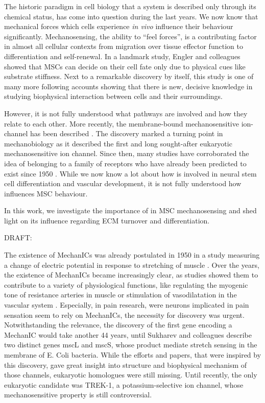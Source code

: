 The historic paradigm in cell biology that a system is described only through its chemical status, has come into question during the last years. We now know that mechanical forces which cells experience \textit{in vivo} influence their behaviour significantly\cite{Hao2015}. Mechanosensing, the ability to “feel forces”, is a contributing factor in almost all cellular contexts from migration over tissue effector function to differentiation and self-renewal. In a landmark study, Engler and colleagues\cite{Engler2006} showed that MSCs can decide on their cell fate only due to physical cues like substrate stiffness. Next to a remarkable discovery by itself, this study is one of many more following accounts showing that there is new, decisive knowledge in studying biophysical interaction between cells and their surroundings.\par

However, it is not fully understood what pathways are involved and how they relate to each other. More recently, the membrane-bound mechanosensitive ion-channel \Piezo{} has been described \cite{Coste2010}. The discovery marked a turning point in mechanobiology as it described the first and long sought-after eukaryotic mechanosensitive ion channel. \cite{Sharif-Naeini2015} Since then, many studies have corroborated the idea of \Piezo{} belonging to a family of receptors who have already been predicted to exist since 1950 \cite{Katz1949}. While we now know a lot about how \Piezo{} is involved in neural stem cell differentiation and vascular development, it is not fully understood how \Piezo{} influences MSC behaviour. \par
In this work, we investigate the importance of \Piezo{} in MSC mechanosensing and shed light on its influence regarding ECM turnover and differentiation.


DRAFT: 


The existence of MechanICs was already postulated in 1950 in a study measuring a change of electric potential in response to stretching of muscle \cite{Katz1949}. Over the years, the existence of MechanICs became increasingly clear, as studies showed them to contribute to a variety of physiological functions, like regulating the myogenic tone of resistance arteries in muscle \cite{Murthy2017} or stimulation of vasodilatation in the vascular system \cite{Zeng2018}. Especially, in pain research, were neurons implicated in pain sensation seem to rely on MechanICs, the necessity for discovery was urgent. Notwithstanding the relevance, the discovery of the first gene encoding a MechanIC would take another 44 years, until Sukharev and colleagues describe two distinct genes mscL and mscS, whose product mediate stretch sensing in the membrane of E. Coli bacteria. While the efforts and papers, that were inspired by this discovery, gave great insight into structure and biophysical mechanism of those channels, eukaryotic homologues were still missing. Until recently, the only eukaryotic candidate was TREK-1, a potassium-selective ion channel, whose mechanosensitive property is still controversial. 

